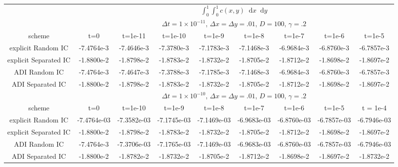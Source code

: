 \documentclass[]{article}
\theoremstyle{definition}
\newcommand*\diff{\mathop{}\!\mathrm{d}}
\numberwithin{equation}{section}
\numberwithin{equation}{section}
\begin{document}
	\begin{adjustwidth}{-2cm}{}
	\begin{center}
		\begin{table}
	\begin{tabular} {c|c|c|c|c|c|c|c|c|}
		\cline{2-9}
		&  \multicolumn{8}{c|}{$\int_0^1\int_{0}^{1}c(x,y) \diff{x}\diff{y}$} \\  \cline{2-9}
		&  \multicolumn{8}{c|}{$\Delta t=1\times10^{-11}$, $\Delta x = \Delta y =.01$, $D = 100$, $\gamma = .2$} \\ \cline{2-9} 
		scheme & t=0 & t=1e-11 & t=1e-10 & t=1e-9 & t=1e-8 & t=1e-7 & t=1e-6 & t=1e-5 \\ 
		\hline
		\multicolumn{1}{|c|}{explicit Random IC}  & -7.4764e-3 &  -7.4646e-3 &  -7.3780e-3 & -7.1783e-3 &-7.1468e-3 & -6.9684e-3 & -6.8760e-3 & -6.7857e-3  \\
		\hline
		\multicolumn{1}{|c|}{explicit Separated IC} & -1.8800e-2 &  -1.8798e-2 &  -1.8783e-2 & -1.8732e-2 &-1.8705e-2 & -1.8712e-2 & -1.8698e-2 & -1.8697e-2 \\
		\hline
		\multicolumn{1}{|c|}{ADI Random IC}  & -7.4764e-3 &  -7.4647e-3 &  -7.3788e-3 & -7.1785e-3 &-7.1468e-3 & -6.9684e-3 & -6.8760e-3 & -6.7857e-3  \\
		\hline
		\multicolumn{1}{|c|}{ADI Separated IC}  & -1.8800e-2 &  -1.8798e-2 &  -1.8783e-2 & -1.8732e-2 &-1.8705e-2 & -1.8712e-2 & -1.8698e-2 & -1.8697e-2  \\
		\hline
		&  \multicolumn{8}{c|}{$\Delta t=1\times10^{-10}$, $\Delta x = \Delta y = .01$, $D = 100$, $\gamma = .2$} \\ \cline{2-9} 
		scheme & t=0 & t=1e-10 & t=1e-9 & t=1e-8 & t=1e-7 & t=1e-6 & t=1e-5 & t = 1e-4\\ 
		\hline
		\multicolumn{1}{|c|}{explicit Random IC} & -7.4764e-03 &  -7.3582e-03 & -7.1745e-03 &  -7.1469e-03 & -6.9683e-03 & -6.8760e-03 & -6.7857e-03 & -6.7946e-03 \\
		\hline
		\multicolumn{1}{|c|}{explicit Separated IC} & -1.8800e-2 &  -1.8798e-2 &  -1.8783e-2 & -1.8732e-2 &-1.8705e-2 & -1.8712e-2 & -1.8698e-2 & -1.8697e-2 \\
		\hline
		\multicolumn{1}{|c|}{ADI Random IC}  & -7.4764e-3 &  -7.3706e-03 &  -7.1765e-03 &  -7.1469e-03 &-6.9683e-03 & -6.8760e-03 & -6.7857e-03 & -6.7946e-03  \\
		\hline
		\multicolumn{1}{|c|}{ADI Separated IC}  & -1.8800e-2 &  -1.8782e-2 &  -1.8732e-2 & -1.8705e-2 &-1.8712e-2 & -1.8698e-2 & -1.8697e-2 & -1.8732e-2  \\

\end{tabular}
\end{table}
\end{center}
\end{adjustwidth}
\end{document}
